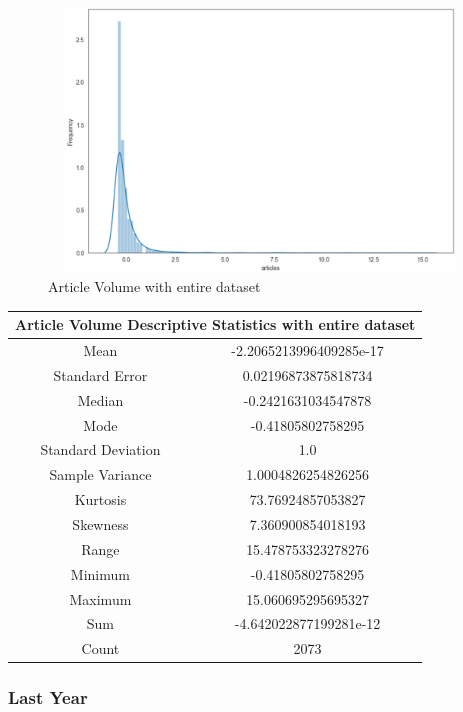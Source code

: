 \begin{figure}[h!]
\centering
\includegraphics[width=15cm,height=7cm,keepaspectratio]{resultsEvaluation/articleDescMax.png}
\caption{Article Volume with entire dataset}
\label{fig:appendix_articleDescMax}
\end{figure}
\begin{center}
\begin{tabular}{ c c }
\hline
\multicolumn{2}{|c|}{Article Volume Descriptive Statistics with entire dataset} \\
\hline
Mean & -2.2065213996409285e-17 \\
Standard Error & 0.02196873875818734 \\
Median & -0.2421631034547878 \\
Mode & -0.41805802758295 \\
Standard Deviation & 1.0 \\
Sample Variance & 1.0004826254826256 \\
Kurtosis & 73.76924857053827 \\
Skewness & 7.360900854018193 \\
Range & 15.478753323278276 \\
Minimum & -0.41805802758295 \\
Maximum & 15.060695295695327 \\
Sum & -4.642022877199281e-12 \\
Count & 2073
\end{tabular}
\end{center}

\subsubsection{Last Year}

